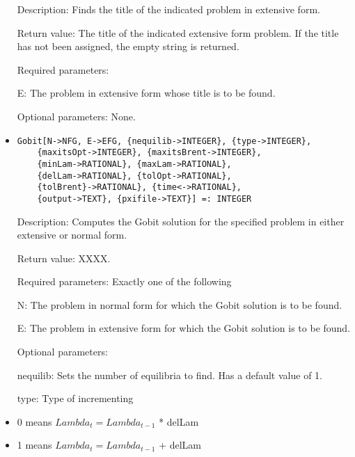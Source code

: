 \begin{itemize}
\bd
\item
[Description:] Finds the title of the indicated problem in extensive form.
\item
[Return value:] The title of the indicated extensive form problem.  If
the title has not been assigned, the empty string is returned.
\item
[Required parameters:]\hfil\null

\bd
\item
[ E:] The problem in extensive form whose title is to be found.
\ed

\item
[Optional parameters:] None.
\ed

\item
\protect \large \begin{verbatim}
Gobit[N->NFG, E->EFG, {nequilib->INTEGER}, {type->INTEGER}, 
	{maxitsOpt->INTEGER}, {maxitsBrent->INTEGER}, 
	{minLam->RATIONAL}, {maxLam->RATIONAL}, 
	{delLam->RATIONAL}, {tolOpt->RATIONAL}, 
	{tolBrent}->RATIONAL}, {time<->RATIONAL}, 
	{output->TEXT}, {pxifile->TEXT}] =: INTEGER
\end{verbatim}\normalsize

\bd
\item
[Description:] Computes the Gobit solution for the specified problem in
either extensive or normal form.  
\item
[Return value:] XXXX.
\item 
[Required parameters:]\hfil\null Exactly one of the following

\bd
\item
[ N:] The problem in normal form for which the Gobit solution is to
be found.
\item	
[ E:] The problem in extensive form for which the Gobit solution 
is to be found.
\ed

\item
[Optional parameters:]\hfil\null

\bd
\item
[ nequilib:] Sets the number of equilibria to find.  Has a default 
value of 1.  
\item
[ type:]  Type of incrementing 
	
\bd
\item
0 means $Lambda_t = Lambda_{t-1}$ * delLam
\item 
1 means $Lambda_t = Lambda_{t-1}$ + delLam
\ed


\end{itemize}
